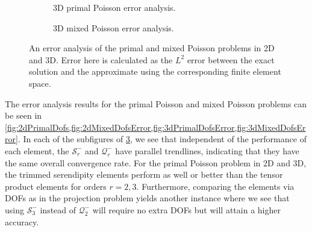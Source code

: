 \documentclass[format=acmsmall,screen,timestamp=false,a4paper]{acmart}
\begin{document}
\begin{figure}[htbp]
\begin{subfigure}[h]{0.48\textwidth}
\begin{tikzpicture}[scale=0.75]
      \end{tikzpicture}
    \caption{3D primal Poisson error analysis. \label{fig:3dPrimalDofsError}}
  \end{subfigure}
  \begin{subfigure}[h]{0.48\textwidth}
      \caption{3D mixed Poisson error analysis. \label{fig:3dMixedDofsError}}
  \end{subfigure}
  \caption{An error analysis of the primal and mixed Poisson problems in 2D and 3D.  Error here is calculated as the $L^2$ error between the exact solution and the approximate using the corresponding finite element space.}
\label{fig:PrimalMixedErrorAnalysis}
\end{figure}


The error analysis results for the primal Poisson and mixed Poisson problems can be seen in \cref{fig:2dPrimalDofs,fig:2dMixedDofsError,fig:3dPrimalDofsError,fig:3dMixedDofsError}.  In each of the subfigures of \cref{fig:PrimalMixedErrorAnalysis}, we see that independent of the performance of each element, the $\mathcal{S}^-_r$ and $\mathcal{Q}^-_r$ have parallel trendlines, indicating that they have the same overall convergence rate.  For the primal Poisson problem in 2D and 3D, the trimmed serendipity elements perform as well or better than the tensor product elements for orders $r=2,3$.  Furthermore, comparing the elements via DOFs as in the projection problem yields another instance where we see that using $\mathcal{S}^-_{3}$ instead of $\mathcal{Q}^-_2$ will require no extra DOFs but will attain a higher accuracy.  
\end{document}
